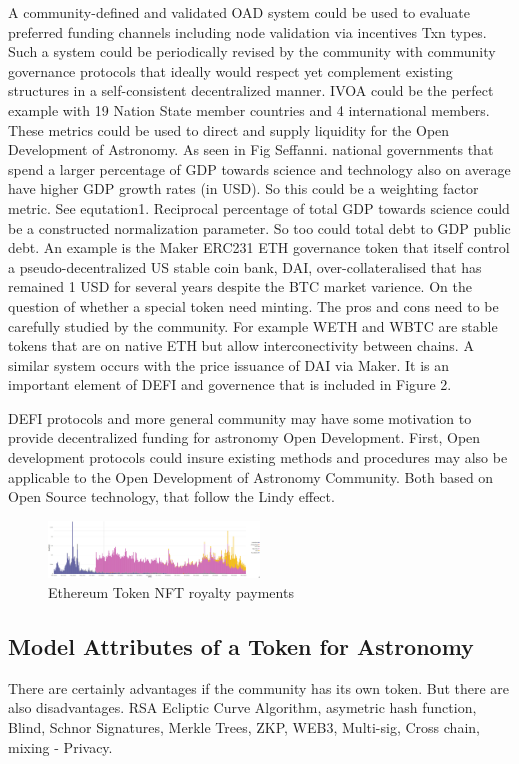 \documentclass[final,5p,times,twocolumn,authoryear]{elsarticle}
\begin{document}
A community-defined and validated OAD system could be used to evaluate preferred funding channels including node validation via incentives Txn types. Such a system could be periodically revised by the community with community governance protocols that ideally would respect yet complement existing structures in a self-consistent decentralized manner. IVOA could be the perfect example with 19 Nation State member countries and 4 international members. These metrics could be used to direct and supply liquidity for the Open Development of Astronomy. As seen in Fig Seffanni. national governments that spend a larger percentage of GDP towards science and technology also on average have higher GDP growth rates (in USD). So this could be a weighting factor metric. See equtation1. Reciprocal percentage of total GDP towards science could be a constructed normalization parameter. So too could total debt to GDP public debt.  An example is the Maker ERC231 ETH governance token that itself control a  pseudo-decentralized US stable coin bank, DAI, over-collateralised that has remained 1 USD for several years despite the BTC market varience.  On the question of whether a special token need minting. The pros and cons need to be carefully studied by the community. For example WETH and WBTC are stable tokens that are on native ETH but allow interconectivity between chains. A similar system occurs with the price issuance of DAI via Maker. It is an important element of DEFI and governence that is included in Figure 2.   

DEFI protocols and more general community may have some motivation to provide decentralized funding for astronomy Open Development. First, Open development protocols could insure existing methods and procedures may also be applicable to the Open Development of Astronomy Community. Both  based on Open Source technology, that follow the Lindy effect.

 \begin{figure}
    \centering
    \includegraphics[width=0.5\textwidth]{figs/royalty_pay.jpg}
    \caption{Ethereum Token NFT royalty payments}
\end{figure}
\subsection{Model Attributes of a Token for Astronomy}
\label{subsec:btc4}
There are certainly advantages if the community has its own token. But there are also disadvantages. RSA Ecliptic Curve Algorithm, asymetric hash function, Blind, Schnor Signatures, Merkle Trees, ZKP,  WEB3, Multi-sig, Cross chain, mixing - Privacy. 
\end{document}
